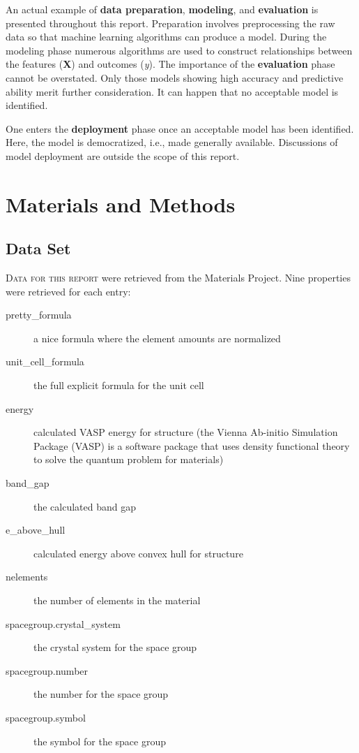 \documentclass[10pt, letter]{report}
\renewcommand{\=}{\, =\, }
\newcommand{\+}{\, +\, }
\renewcommand{\-}{\, -\, }
\begin{document}
An actual example of \textbf{data preparation}, \textbf{modeling}, and \textbf{evaluation} is presented throughout this report. Preparation involves preprocessing the raw data so that machine learning algorithms can produce a model. During the modeling phase numerous algorithms are used to construct relationships between the features (\textbf{X}) and outcomes (\textsl{y}). The importance of the \textbf{evaluation} phase cannot be overstated. Only those models showing high accuracy and predictive ability merit further consideration. It can happen that no acceptable model is identified.

One enters the \textbf{deployment} phase once an acceptable model has been identified. Here, the model is democratized, i.e., made generally available. Discussions of model deployment are outside the scope of this report.

\chapter{Materials and Methods}

\section{Data Set}
\textsc{Data for this report} were retrieved from the Materials Project. Nine properties were retrieved for each entry:
\begin{description}
\item[pretty\_formula] a nice formula where the element amounts are normalized
\item[unit\_cell\_formula] the full explicit formula for the unit cell
\item[energy] calculated VASP energy for structure (the Vienna Ab-initio Simulation Package (VASP) is a software package that uses density functional theory to solve the quantum problem for materials)
\item[band\_gap] the calculated band gap
\item[e\_above\_hull] calculated energy above convex hull for structure
\item[nelements] the number of elements in the material
\item[spacegroup.crystal\_system] the crystal system for the space group
\item[spacegroup.number] the number for the space group
\item[spacegroup.symbol] the symbol for the space group
\end{description}
\end{document}
